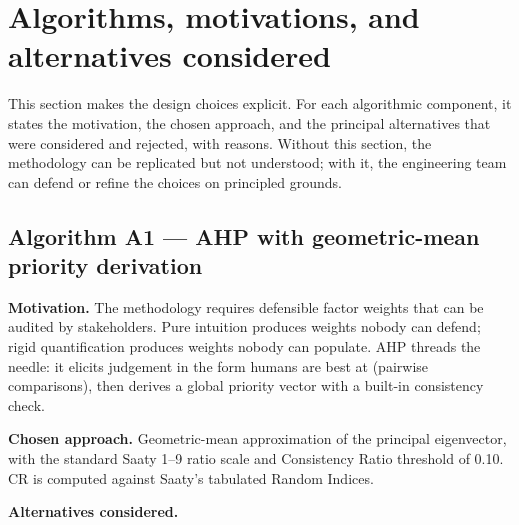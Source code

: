 \documentclass[11pt,a4paper]{article}
\begin{document}
\section{Algorithms, motivations, and alternatives considered}

This section makes the design choices explicit. For each algorithmic component, it states the motivation, the chosen approach, and the principal alternatives that were considered and rejected, with reasons. Without this section, the methodology can be replicated but not understood; with it, the engineering team can defend or refine the choices on principled grounds.

\subsection{Algorithm A1 — AHP with geometric-mean priority derivation}

\textbf{Motivation.} The methodology requires defensible factor weights that can be audited by stakeholders. Pure intuition produces weights nobody can defend; rigid quantification produces weights nobody can populate. AHP threads the needle: it elicits judgement in the form humans are best at (pairwise comparisons), then derives a global priority vector with a built-in consistency check.

\textbf{Chosen approach.} Geometric-mean approximation of the principal eigenvector, with the standard Saaty 1--9 ratio scale and Consistency Ratio threshold of 0.10. CR is computed against Saaty's tabulated Random Indices.

\textbf{Alternatives considered.}
\end{document}
